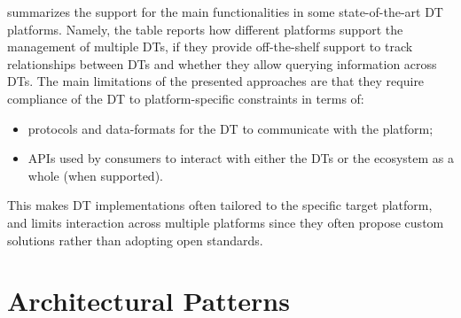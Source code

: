 summarizes the support for the main functionalities in some state-of-the-art \ac{DT} platforms.
%
Namely, the table reports how different platforms support the management of multiple \acp{DT}, if they provide off-the-shelf support to track relationships between \acp{DT} and whether they allow querying information across \acp{DT}.
%
The main limitations of the presented approaches are that they require compliance of the \ac{DT} to platform-specific constraints in terms of:
\begin{itemize}
    \item protocols and data-formats for the \ac{DT} to communicate with the platform;
    \item APIs used by consumers to interact with either the \acp{DT} or the ecosystem as a whole (when supported). 
\end{itemize}
%
This makes \ac{DT} implementations often tailored to the specific target platform, and limits interaction across multiple platforms since they often propose custom solutions rather than adopting open standards.

\section{Architectural Patterns}
\label{sec:dte:dte:architecture}

